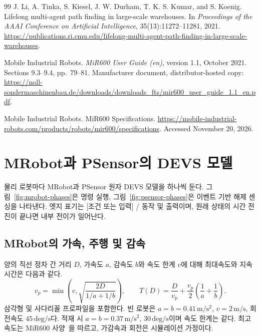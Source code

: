 \documentclass[11pt,a4paper]{article}
\theoremstyle{remark}
\begin{document}
{\begin{thebibliography}{99}
J. Li, A. Tinka, S. Kiesel, J. W. Durham, T. K. S. Kumar, and S. Koenig.
\newblock Lifelong multi-agent path finding in large-scale warehouses.
\newblock In \emph{Proceedings of the AAAI Conference on Artificial Intelligence},
35(13):11272--11281, 2021.
\newblock \url{https://publications.ri.cmu.edu/lifelong-multi-agent-path-finding-in-large-scale-warehouses}.

Mobile Industrial Robots.
\newblock \emph{MiR600 User Guide (en)}, version 1.1, October 2021.
\newblock Sections 9.3--9.4, pp.~79--81.
\newblock Manufacturer document, distributor-hosted copy:
\url{https://noll-sondermaschinenbau.de/downloads/downloads_fts/mir600_user_guide_1.1_en.pdf}.

Mobile Industrial Robots.
\newblock MiR600 Specifications.
\newblock \url{https://mobile-industrial-robots.com/products/robots/mir600/specifications}.
\newblock Accessed November 20, 2026.

\end{thebibliography}
}

\appendix
\section{MRobot과 PSensor의 DEVS 모델}
\label{app:plant-models}
물리 로봇마다 MRobot과 PSensor 원자 DEVS 모델을 하나씩 둔다. 그림~\ref{fig:mrobot-phases}은 명령 실행, 그림~\ref{fig:psensor-phases}은 이벤트 기반 해제 센싱을 나타낸다. 엣지 표기는 [조건 또는 입력] / 동작 및 출력이며, 원래 상태의 시간 전진이 끝나면 내부 전이가 일어난다.

\subsection{MRobot의 가속, 주행 및 감속}
양의 직선 정차 간 거리 $D$, 가속도 $a$, 감속도 $b$와 속도 한계 $v$에 대해 최대속도와 지속시간은 다음과 같다.
\begin{equation}
 v_p=\min\!\left(v,\sqrt{\frac{2D}{1/a+1/b}}\right),\qquad
 T(D)=\frac{D}{v_p}+\frac{v_p}{2}\left(\frac1a+\frac1b\right).
 \label{eq:profile}
\end{equation}
삼각형 및 사다리꼴 프로파일을 포함한다. 빈 로봇은 $a=b=0.41\,\mathrm{m/s^2}$, $v=2\,\mathrm{m/s}$, 회전속도 $45\,\mathrm{deg/s}$다. 적재 시 $a=b=0.37\,\mathrm{m/s^2}$, $30\,\mathrm{deg/s}$이며 속도 한계는 같다. 최고속도는 MiR600 사양~\cite{mir600}을 따르고, 가감속과 회전은 시뮬레이션 가정이다.
\end{document}
